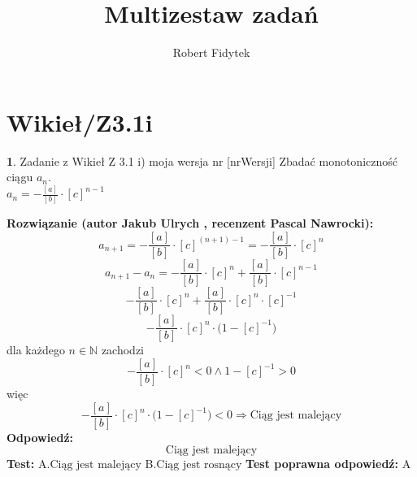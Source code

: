 \documentclass[12pt, a4paper]{article}
\title{Multizestaw zadań}
\author{Robert Fidytek}
\date{}
\theoremstyle{definition} %
\newtheorem{zad}{}
\newcommand{\kategoria}[1]{\section{#1}} %
\newcommand{\zadStart}[1]{\begin{zad}#1\newline} %
\newcommand{\zadStop}{\end{zad}}   %
\newcommand{\rozwStart}[2]{\noindent \textbf{Rozwiązanie (autor #1 , recenzent #2): }\newline} %
\newcommand{\rozwStop}{\newline}                                            %
\newcommand{\odpStart}{\noindent \textbf{Odpowiedź:}\newline}    %
\newcommand{\odpStop}{\newline}                                             %
\newcommand{\testStart}{\noindent \textbf{Test:}\newline} %
\newcommand{\testStop}{\newline} %
\newcommand{\kluczStart}{\noindent \textbf{Test poprawna odpowiedź:}\newline} %
\newcommand{\kluczStop}{\newline} %
\begin{document}
\maketitle


\kategoria{Wikieł/Z3.1i}
\zadStart{Zadanie z Wikieł Z 3.1 i) moja wersja nr [nrWersji]}
Zbadać monotoniczność ciągu $a_{n}$.\\ $a_{n}=-\frac{[a]}{[b]}\cdot[c]^{n-1}$
\zadStop
\rozwStart{Jakub Ulrych}{Pascal Nawrocki}
$$a_{n+1}=-\frac{[a]}{[b]}\cdot[c]^{(n+1)-1}=-\frac{[a]}{[b]}\cdot[c]^{n}$$
$$a_{n+1}-a_{n}=-\frac{[a]}{[b]}\cdot[c]^{n}+\frac{[a]}{[b]}\cdot[c]^{n-1}$$
$$-\frac{[a]}{[b]}\cdot[c]^{n}+\frac{[a]}{[b]}\cdot[c]^{n}\cdot[c]^{-1}$$
$$-\frac{[a]}{[b]}\cdot[c]^{n}\cdot\big(1-[c]^{-1}\big)$$
dla każdego $n\in\mathbb{N}$ zachodzi
$$-\frac{[a]}{[b]}\cdot[c]^{n}<0\land 1-[c]^{-1}>0$$więc
$$-\frac{[a]}{[b]}\cdot[c]^{n}\cdot\big(1-[c]^{-1}\big)<0\Rightarrow \text{Ciąg jest malejący}$$
\rozwStop
\odpStart
$$\text{Ciąg jest malejący}$$
\odpStop
\testStart
A.$\text{Ciąg jest malejący}$
B.$\text{Ciąg jest rosnący}$
\testStop
\kluczStart
A
\kluczStop
\end{document}
